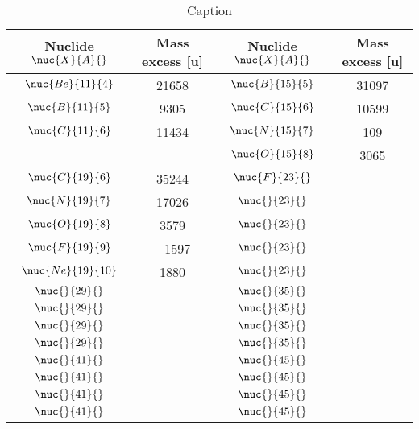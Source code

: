 \begin{table}[H]
    \centering
    \begin{tabular}{cc|cc}
    \toprule
        Nuclide $\nuc{X}{A}{}$ & Mass excess [u] & Nuclide $\nuc{X}{A}{}$ & Mass excess [u]\\
    \midrule
        $\nuc{Be}{11}{4}$   & \num{21658}   & $\nuc{B}{15}{5}$  & \num{31097}\\
        $\nuc{B}{11}{5}$    & \num{9305}    & $\nuc{C}{15}{6}$  & \num{10599}\\
        $\nuc{C}{11}{6}$    & \num{11434}   & $\nuc{N}{15}{7}$  & \num{109}\\
                            &               & $\nuc{O}{15}{8}$  & \num{3065}\\
    \midrule
        $\nuc{C}{19}{6}$    & \num{35244}   & $\nuc{F}{23}{}$    & \num{}\\
        $\nuc{N}{19}{7}$    & \num{17026}   & $\nuc{}{23}{}$    & \num{}\\
        $\nuc{O}{19}{8}$    & \num{3579}    & $\nuc{}{23}{}$    & \num{}\\
        $\nuc{F}{19}{9}$    & \num{-1597}   & $\nuc{}{23}{}$    & \num{}\\
        $\nuc{Ne}{19}{10}$  & \num{1880}    & $\nuc{}{23}{}$    & \num{}\\
    \midrule
        $\nuc{}{29}{}$      & \num{}        & $\nuc{}{35}{}$    & \num{}\\
        $\nuc{}{29}{}$      & \num{}        & $\nuc{}{35}{}$    & \num{}\\
        $\nuc{}{29}{}$      & \num{}        & $\nuc{}{35}{}$    & \num{}\\
        $\nuc{}{29}{}$      & \num{}        & $\nuc{}{35}{}$    & \num{}\\
    \midrule
        $\nuc{}{41}{}$      & \num{}        & $\nuc{}{45}{}$    & \num{}\\
        $\nuc{}{41}{}$      & \num{}        & $\nuc{}{45}{}$    & \num{}\\
        $\nuc{}{41}{}$      & \num{}        & $\nuc{}{45}{}$    & \num{}\\
        $\nuc{}{41}{}$      & \num{}        & $\nuc{}{45}{}$    & \num{}\\
    \bottomrule
    \end{tabular}
    \caption{Caption}
    \label{tab:my_label}
\end{table}